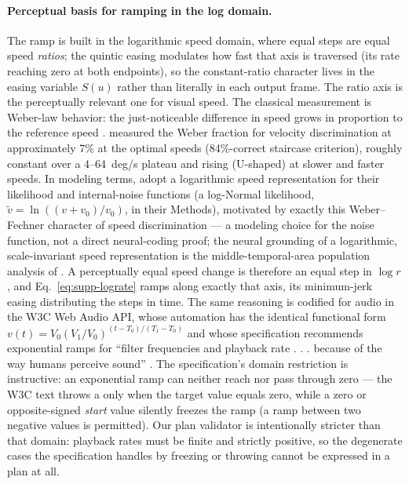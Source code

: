 \paragraph{Perceptual basis for ramping in the log domain.}
The ramp is built in the logarithmic speed domain, where equal steps are
equal speed \emph{ratios}; the quintic easing modulates how fast that
axis is traversed (its rate reaching zero at both endpoints), so the
constant-ratio character lives in the easing variable $S(u)$ rather
than literally in each output frame. The ratio axis is the perceptually
relevant one for visual speed. The classical measurement is Weber-law
behavior: the
just-noticeable difference in speed grows in proportion to the reference
speed \citep{brown1960weber}. \citet{debruyn1988velocity} measured the
Weber fraction for velocity discrimination at approximately 7\% at the
optimal speeds (84\%-correct staircase criterion), roughly constant over
a 4--64~deg/s plateau and rising (U-shaped) at slower and faster
speeds. In modeling terms, \citet{stocker2006noise} adopt a logarithmic
speed representation for their likelihood and internal-noise functions
(a log-Normal likelihood, $\tilde{v} = \ln((v + v_0)/v_0)$, in their
Methods), motivated by exactly this Weber--Fechner character of speed
discrimination --- a modeling choice for the noise function, not a
direct neural-coding proof; the neural grounding of a logarithmic,
scale-invariant speed representation is the middle-temporal-area
population analysis of \citet{nover2005logarithmic}. A perceptually
equal speed change is therefore an equal step in $\log r$, and
Eq.~\eqref{eq:supp-lograte} ramps along exactly that axis, its
minimum-jerk easing distributing the steps in time. The same reasoning is
codified for audio in the W3C Web Audio API, whose
 automation has the identical
functional form $v(t) = V_0 (V_1/V_0)^{(t - T_0)/(T_1 - T_0)}$ and whose
specification recommends exponential ramps for ``filter frequencies and
playback rate . . . because of the way humans perceive sound''
\citep{webaudio_spec}. The specification's domain restriction is
instructive: an exponential ramp can neither reach nor pass through
zero --- the W3C text throws a  only when the target
value equals zero, while a zero or opposite-signed \emph{start} value
silently freezes the ramp (a ramp between two negative values is
permitted). Our plan validator is intentionally stricter than that
domain: playback rates must be finite and strictly positive, so the
degenerate cases the specification handles by freezing or throwing
cannot be expressed in a plan at all.

